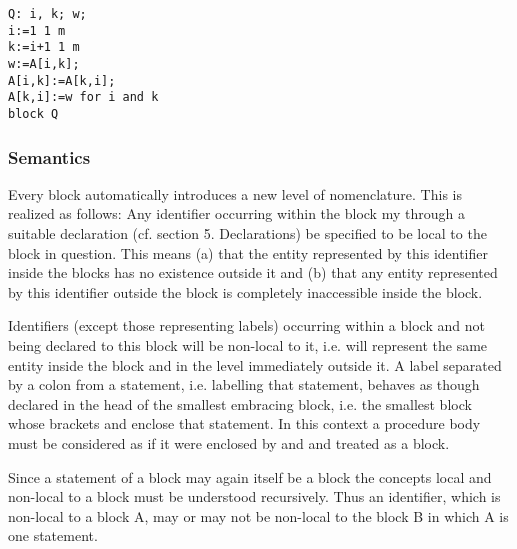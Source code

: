 \documentclass[a4paper,11pt]{article}
\begin{document}
\begin{flushleft}
\texttt{Q:   i, k;  w;\\
  \hspace{1.85cm} i:=1  1  m \\
  \hspace{1.85cm} k:=i+1  1  m \\
  \hspace{1.85cm} w:=A[i,k];\\
  \hspace{3.1cm}A[i,k]:=A[k,i];\\
  \hspace{3.1cm}A[k,i]:=w  for i and k\\
  \hspace{0.65cm} block Q}\\
\end{flushleft}


\subsubsection{Semantics}
\label{LblCompoundStatementsSemantics}

Every block automatically introduces a new level of nomenclature.
This is realized as follows: Any identifier occurring within the block
my through a suitable declaration (cf. section 5.  Declarations) be
specified to be local to the block in question.  This means (a) that
the entity represented by this identifier inside the blocks has no
existence outside it and (b) that any entity represented by this
identifier outside the block is completely inaccessible inside the
block.

Identifiers (except those representing labels) occurring within a
block and not being declared to this block will be non-local to it,
i.e.  will represent the same entity inside the block and in the level
immediately outside it.  A label separated by a colon from a
statement, i.e.  labelling that statement, behaves as though declared
in the head of the smallest embracing block, i.e.  the smallest block
whose brackets  and  enclose that statement.  In
this context a procedure body must be considered as if it were
enclosed by  and  and treated as a block.

Since a statement of a block may again itself be a block the concepts
local and non-local to a block must be understood recursively.  Thus
an identifier, which is non-local to a block A, may or may not be
non-local to the block B in which A is one statement.
\end{document}
